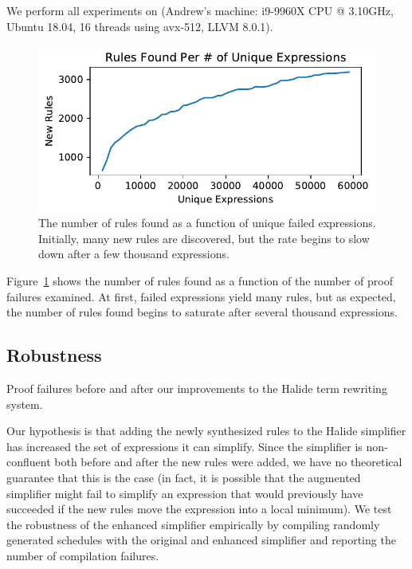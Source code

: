 \documentclass[sigplan,10pt,review,anonymous]{acmart}\settopmatter{printfolios=true,printccs=false,printacmref=false}
\begin{document}
We perform all experiments on (Andrew's machine: i9-9960X CPU @ 3.10GHz, Ubuntu 18.04, 16 threads using avx-512, LLVM 8.0.1).

\begin{figure}[htb]
  \includegraphics[width=\columnwidth]{figures/num-rules-found.pdf}
  \caption{The number of rules found as a function of unique failed expressions.  Initially, many new rules are discovered,
    but the rate begins to slow down after a few thousand expressions.}
  \label{fig:num-rules-found}
\end{figure}

Figure~\ref{fig:num-rules-found} shows the number of rules found as a function of the number of proof failures
examined.  At first, failed expressions yield many rules, but as expected, the number of rules found
begins to saturate after several thousand expressions.

\subsection{Robustness}
\begin{table}[!ht]
  \caption{Proof failures before and after our improvements to the Halide term rewriting system.}
  \label{tab:simplifierfailures}
  \small
  
\end{table}

Our hypothesis is that adding the newly synthesized rules to the Halide
simplifier has increased the set of expressions it can simplify. Since the
simplifier is non-confluent both before and after the new rules were added, we
have no theoretical guarantee that this is the case (in fact, it is possible
that the augmented simplifier might fail to simplify an expression that would
previously have succeeded if the new rules move the expression into a local
minimum). We test the robustness of the enhanced simplifier empirically by
compiling randomly generated schedules with the original and enhanced simplifier
and reporting the number of compilation failures.
\end{document}
